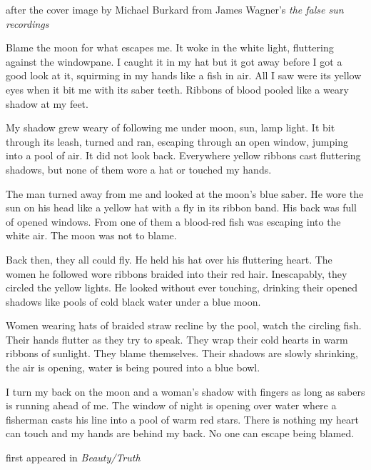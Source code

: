after the cover image by Michael Burkard from James Wagner's \emph{the
false sun recordings}

Blame the moon for what escapes me. It woke in the white light,
fluttering against the windowpane. I caught it in my hat but it got away
before I got a good look at it, squirming in my hands like a fish in
air. All I saw were its yellow eyes when it bit me with its saber teeth.
Ribbons of blood pooled like a weary shadow at my feet.

My shadow grew weary of following me under moon, sun, lamp light. It bit
through its leash, turned and ran, escaping through an open window,
jumping into a pool of air. It did not look back. Everywhere yellow
ribbons cast fluttering shadows, but none of them wore a hat or touched
my hands.

The man turned away from me and looked at the moon's blue saber. He wore
the sun on his head like a yellow hat with a fly in its ribbon band. His
back was full of opened windows. From one of them a blood-red fish was
escaping into the white air. The moon was not to blame.

Back then, they all could fly. He held his hat over his fluttering
heart. The women he followed wore ribbons braided into their red hair.
Inescapably, they circled the yellow lights. He looked without ever
touching, drinking their opened shadows like pools of cold black water
under a blue moon.

Women wearing hats of braided straw recline by the pool, watch the
circling fish. Their hands flutter as they try to speak. They wrap their
cold hearts in warm ribbons of sunlight. They blame themselves. Their
shadows are slowly shrinking, the air is opening, water is being poured
into a blue bowl.

I turn my back on the moon and a woman's shadow with fingers as long as
sabers is running ahead of me. The window of night is opening over water
where a fisherman casts his line into a pool of warm red stars. There is
nothing my heart can touch and my hands are behind my back. No one can
escape being blamed.

first appeared in \emph{Beauty/Truth}
